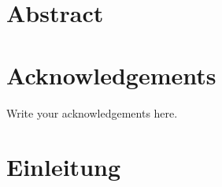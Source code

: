 \documentclass[a4paper,UKenglish,compactauthor]{lipics-v2021}
\begin{document}
\setcounter{page}{1}


\section*{Abstract}

\newpage

\section*{Acknowledgements}

Write your acknowledgements here.

\cleardoublepage



\small\normalsize
{} %
\tableofcontents
{}


\small\normalsize

\cleardoublepage



\setcounter{page}{1}

\section{Einleitung}
\label{sec:introduction}

\end{document}
